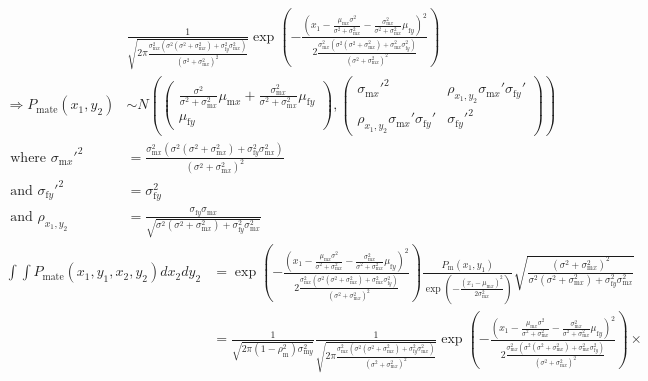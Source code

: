 \documentclass{article}
\newcommand{\x}[1]{\text{#1}}
\begin{document}
\begin{landscape}
{\begin{align*}
\\&\frac{1}{\sqrt{2\pi\frac{\sigma_{\x{m}x}^2(\sigma^2(\sigma^2+\sigma_{\x{m}x}^2)+\sigma_{\x{f}y}^2\sigma_{\x{m}x}^2)}{(\sigma^2+\sigma_{\x{m}x}^2)^2}}}\exp\left(-\frac{\left(x_1-\frac{\mu_{\x{m}x}\sigma^2}{\sigma^2+\sigma_{\x{m}x}^2}-\frac{\sigma_{\x{m}x}^2}{\sigma^2+\sigma_{\x{m}x}^2}\mu_{\x{f}y}\right)^2}{2\frac{\sigma_{\x{m}x}^2(\sigma^2(\sigma^2+\sigma_{\x{m}x}^2)+\sigma_{\x{m}x}^2\sigma_{\x{f}y}^2)}{(\sigma^2+\sigma_{\x{m}x}^2)^2}}\right)
\\ \Rightarrow P_\text{mate}(x_1,y_2)&\sim N\left(\left(\begin{array}{cc}\frac{\sigma^2}{\sigma^2+\sigma_{\x{m}x}^2}\mu_{\x{m}x}+\frac{\sigma_{\x{m}x}^2}{\sigma^2+\sigma_{\x{m}x}^2}\mu_{\x{f}y} \\ \mu_{\x{f}y} \end{array}\right),\left(\begin{array}{cc} \sigma_{\x{m}x}'^2 & \rho_{x_1,y_2}\sigma_{\x{m}x}'\sigma_{\x{f}y}' \\ \rho_{x_1,y_2}\sigma_{\x{m}x}'\sigma_{\x{f}y}' & \sigma_{\x{f}y}'^2  \end{array}\right)\right)
\\ \text{ where } \sigma_{\x{m}x}'^2&=\frac{\sigma_{\x{m}x}^2(\sigma^2(\sigma^2+\sigma_{\x{m}x}^2)+\sigma_{\x{f}y}^2\sigma_{\x{m}x}^2)}{(\sigma^2+\sigma_{\x{m}x}^2)^2}
\\ \text{ and } \sigma_{\x{f}y}'^2&=\sigma_{\x{f}y}^2
\\ \text{ and } \rho_{x_1,y_2}&=\frac{\sigma_{\x{f}y}\sigma_{\x{m}x}}{\sqrt{\sigma^2(\sigma^2+\sigma_{\x{m}x}^2)+\sigma_{\x{f}y}^2\sigma_{\x{m}x}^2}}
\end{align*}
}
\begin{align*}
\int\int P_\text{mate}(x_1,y_1,x_2,y_2)dx_2dy_2&=\exp\left(-\frac{\left(x_1-\frac{\mu_{\x{m}x}\sigma^2}{\sigma^2+\sigma_{\x{m}x}^2}-\frac{\sigma_{\x{m}x}^2}{\sigma^2+\sigma_{\x{m}x}^2}\mu_{\x{f}y}\right)^2}{2\frac{\sigma_{\x{m}x}^2(\sigma^2(\sigma^2+\sigma_{\x{m}x}^2)+\sigma_{\x{m}x}^2\sigma_{\x{f}y}^2)}{(\sigma^2+\sigma_{\x{m}x}^2)^2}}\right)\frac{P_\x{m}(x_1,y_1)}{\exp\left(-\frac{(x_1-\mu_{\x{m}x})^2}{2\sigma_{\x{m}x}^2}\right)}\sqrt{\frac{(\sigma^2+\sigma_{\x{m}x}^2)^2}{\sigma^2(\sigma^2+\sigma_{\x{m}x}^2)+\sigma_{\x{f}y}^2\sigma_{\x{m}x}^2}} 
\\&=\frac{1}{\sqrt{2\pi(1-\rho_\x{m}^2)\sigma_{\x{m}y}^2}}\frac{1}{\sqrt{2\pi\frac{\sigma_{\x{m}x}^2(\sigma^2(\sigma^2+\sigma_{\x{m}x}^2)+\sigma_{\x{f}y}^2\sigma_{\x{m}x}^2)}{(\sigma^2+\sigma_{\x{m}x}^2)^2}}} \exp\left(-\frac{\left(x_1-\frac{\mu_{\x{m}x}\sigma^2}{\sigma^2+\sigma_{\x{m}x}^2}-\frac{\sigma_{\x{m}x}^2}{\sigma^2+\sigma_{\x{m}x}^2}\mu_{\x{f}y}\right)^2}{2\frac{\sigma_{\x{m}x}^2(\sigma^2(\sigma^2+\sigma_{\x{m}x}^2)+\sigma_{\x{m}x}^2\sigma_{\x{f}y}^2)}{(\sigma^2+\sigma_{\x{m}x}^2)^2}}\right)\times

\end{align*}
\end{landscape}
\end{document}
